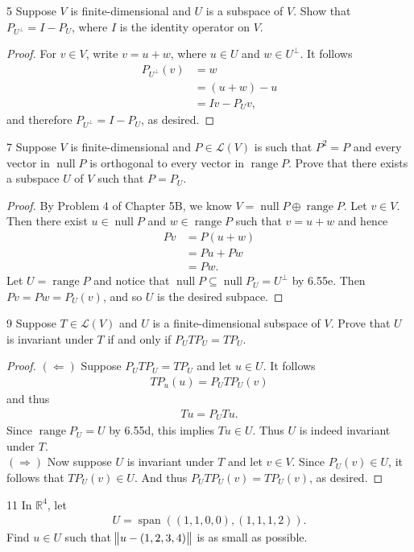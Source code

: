 \documentclass{extarticle}
\newenvironment{problem}[1]{\begin{prob*}{#1}{}}{\end{prob*}}
\newcommand{\R}{\mathbb{R}}
\DeclareMathOperator{\Span}{span}
\newcommand{\Hom}{\mathcal{L}}
\DeclareMathOperator{\Null}{null}
\DeclareMathOperator{\Range}{range}
\begin{document}
\begin{problem}{5}
Suppose $V$ is finite-dimensional and $U$ is a subspace of $V$.  Show that $P_{U^\perp}= I - P_U$, where $I$ is the identity operator on $V$.
\end{problem}
\begin{proof}
For $v\in V$, write $v = u + w$, where $u\in U$ and $w \in U^\perp$.  It follows
\begin{align*}
P_{U^\perp}(v) &= w\\
&= (u + w) - u\\
&= Iv - P_Uv,
\end{align*}
and therefore $P_{U^\perp}= I - P_U$, as desired.
\end{proof}

\begin{problem}{7}
Suppose $V$ is finite-dimensional and $P\in\Hom(V)$ is such that $P^2 = P$ and every vector in $\Null P$ is orthogonal to every vector in $\Range P$.  Prove that there exists a subspace $U$ of $V$ such that $P = P_U$.
\end{problem}
\begin{proof}
By Problem 4 of Chapter 5B, we know $V = \Null P \oplus \Range P$.  Let $v\in V$.  Then there exist $u\in \Null P$ and $w\in \Range P$ such that $v = u + w$ and hence
\begin{align*}
Pv &= P(u + w)\\
&= Pu + Pw\\
&= Pw.
\end{align*}
Let $U = \Range P$ and notice that $\Null P\subseteq \Null P_U = U^\perp$ by 6.55e.  Then $Pv = Pw = P_U(v)$, and so $U$ is the desired subpace.
\end{proof}

\begin{problem}{9}
Suppose $T\in\Hom(V)$ and $U$ is a finite-dimensional subspace of $V$.  Prove that $U$ is invariant under $T$ if and only if $P_U T P_U = TP_U$.
\end{problem}
\begin{proof}
$(\Leftarrow)$ Suppose $P_UTP_U = TP_U$ and let $u \in U$.  It follows
\begin{align*}
TP_u(u) = P_UTP_U(v)
\end{align*}
and thus
\begin{align*}
Tu = P_UTu.
\end{align*}
Since $\Range P_U = U$ by 6.55d, this implies $Tu \in U$.  Thus $U$ is indeed invariant under $T$.\\
\indent $(\Rightarrow)$ Now suppose $U$ is invariant under $T$ and let $v\in V$.  Since $P_U(v) \in U$, it follows that $TP_U(v) \in U$.  And thus $P_UTP_U(v) = TP_U(v)$, as desired.
\end{proof}

\begin{problem}{11}
In $\R^4$, let 
\begin{align*}
U = \Span\left((1, 1, 0, 0), (1, 1, 1, 2)\right).
\end{align*}
Find $u\in U$ such that $\norm{u - (1, 2, 3, 4)}$ is as small as possible.
\end{problem} 
\end{document}

